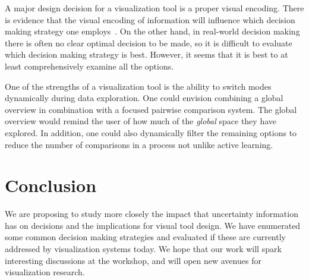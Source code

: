 A major design decision for a visualization tool is a proper visual encoding.
There is evidence that the visual encoding of information will
influence which decision making strategy one employs~\citep{Jarvenpaa:1990}.
On the other hand, in real-world decision making there is often no clear
optimal decision to be made, so it is difficult to evaluate which decision
making strategy is best. However, it seems that it is best to at least
comprehensively examine all the options.

One of the strengths of a visualization tool is the ability to switch modes
dynamically during data exploration. One could envision combining a
global overview in combination with a focused pairwise comparison system.
The global overview would remind the user of how much of the \emph{global}
space they have explored. In addition, one could also dynamically filter
the remaining options to reduce the number of comparisons in a process
not unlike active learning.





\section{Conclusion}

We are proposing to study more closely the impact that uncertainty information
has on decisions and the implications for visual tool design. 
We have enumerated some common decision making strategies and evaluated
if these are currently addressed by visualization systems today. We hope that our work
will spark interesting discussions at the workshop, and will open new avenues
for visualization research. 

